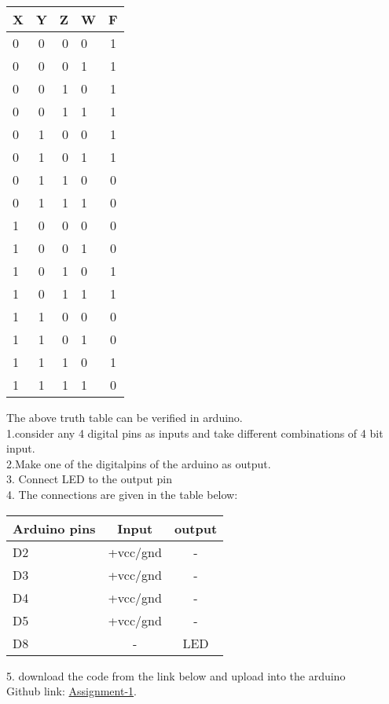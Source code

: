\documentclass[10pt,a4paper]{report}
\begin{document}
\begin{multicols}{2}
  \begin{center}
    \label{tab:truthtable}
    \setlength{\arrayrulewidth}{0.5mm}
\setlength{\tabcolsep}{18pt}
\renewcommand{\arraystretch}{1.5}
    \begin{tabular}{|l|c|r|l|c|}
    \hline %
      \textbf{X} & \textbf{Y} & \textbf{Z} & \textbf{W} & \textbf{F}\\
      \hline
      0 & 0 & 0 & 0 & 1\\
      0 & 0 & 0 & 1 & 1\\
      0 & 0 & 1 & 0 & 1\\
      0 & 0 & 1 & 1 & 1\\
      0 & 1 & 0 & 0 & 1\\
      0 & 1 & 0 & 1 & 1\\
      0 & 1 & 1 & 0 & 0\\
      0 & 1 & 1 & 1 & 0\\
      1 & 0 & 0 & 0 & 0\\
      1 & 0 & 0 & 1 & 0\\
      1 & 0 & 1 & 0 & 1\\
      1 & 0 & 1 & 1 & 1\\
      1 & 1 & 0 & 0 & 0\\
      1 & 1 & 0 & 1 & 0\\
      1 & 1 & 1 & 0 & 1\\
      1 & 1 & 1 & 1 & 0\\
      \hline
      
    \end{tabular}
  \end{center}

 
 \raggedright The above truth table can be verified in arduino.\\1.consider any 4 digital pins as inputs and take different combinations of 4 bit input.\\2.Make one of the digitalpins of the arduino as output.\\3. Connect LED to the output pin \\4. The connections are given in the table below:

 \begin{center}
 \setlength{\arrayrulewidth}{0.5mm}
\setlength{\tabcolsep}{15pt}
\renewcommand{\arraystretch}{1.5}
    \begin{tabular}{|l|c|c|}
    \hline 
    \textbf{Arduino pins} & \textbf{Input} & \textbf{output} \\
    \hline
    D2 & +vcc/gnd & -\\
    D3 & +vcc/gnd & -\\
    D4 & +vcc/gnd & -\\
    D5 & +vcc/gnd & -\\
    D8 & - & LED\\
    \hline
      \end{tabular}
  \end{center}
\raggedright 5. download the code from the link below and upload into the arduino\\
Github link: \href{https://github.com/lakshmikamakshi/FWC/tree/main/assignment_1/codes}{Assignment-1}.



  \end{multicols}
\end{document}
